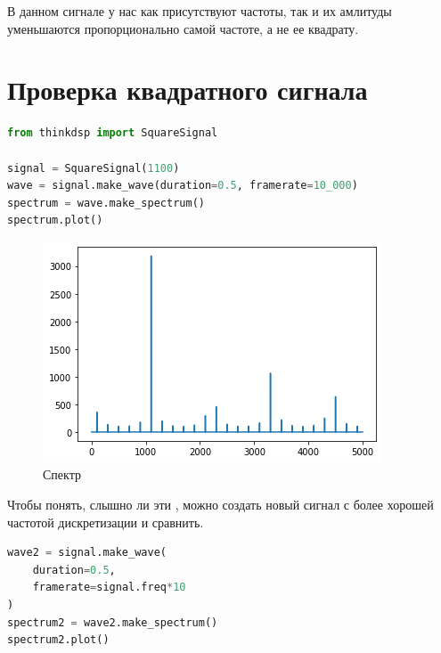 \documentclass[a4paper,12pt]{report}
\begin{document}
    В данном сигнале у нас как присутствуют  частоты, так и их амлитуды уменьшаются пропорционально самой частоте, а не ее квадрату.
    
    \chapter{Проверка квадратного сигнала}
    
\begin{lstlisting}[language=Python,caption=Строим квадратный сигнал]
from thinkdsp import SquareSignal

signal = SquareSignal(1100)
wave = signal.make_wave(duration=0.5, framerate=10_000)
spectrum = wave.make_spectrum()
spectrum.plot()
\end{lstlisting}

    \begin{figure}[H]
        \centering
        \includegraphics[width=\textwidth]{ex3_square_spectrum.png}
        \caption{Спектр}
        \label{fig:ex3_square_spectrum}
    \end{figure}
    
    Чтобы понять, слышно ли эти , можно создать новый сигнал с более хорошей частотой дискретизации и сравнить.
    
\begin{lstlisting}[language=Python,caption=Строим квадратный сигнал]
wave2 = signal.make_wave(
    duration=0.5, 
    framerate=signal.freq*10
)
spectrum2 = wave2.make_spectrum()
spectrum2.plot()
\end{lstlisting}
\end{document}
